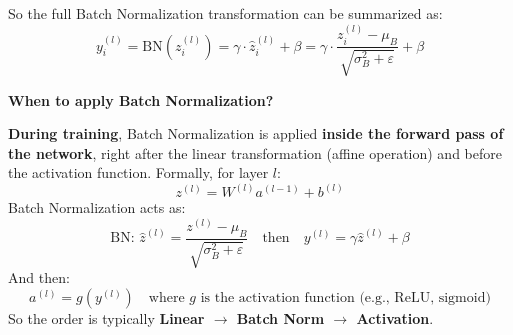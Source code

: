 \newpage

\noindent
So the full Batch Normalization transformation can be summarized as:
\begin{equation}
    y_i^{(l)} =
    \mathrm{BN}\left(z_i^{(l)}\right) =
    \gamma \cdot \hat{z}_i^{(l)} + \beta =
    \gamma \cdot \dfrac{z_i^{(l)} - \mu_B}{\sqrt{\sigma_B^2 + \varepsilon}} + \beta
\end{equation}

\highspace
\begin{flushleft}
    \textcolor{Green3}{ \textbf{When to apply Batch Normalization?}}
\end{flushleft}
\textbf{During training}, Batch Normalization is applied \textbf{inside the forward pass of the network}, right after the linear transformation (affine operation) and before the activation function. Formally, for layer $l$:
\begin{equation*}
    z^{(l)} = W^{(l)} a^{(l-1)} + b^{(l)}
\end{equation*}
Batch Normalization acts as:
\begin{equation*}
    \text{BN: } \hat{z}^{(l)} = \dfrac{z^{(l)} - \mu_B}{\sqrt{\sigma_B^2 + \varepsilon}} \quad \text{then} \quad y^{(l)} = \gamma \hat{z}^{(l)} + \beta
\end{equation*}
And then:
\begin{equation*}
    a^{(l)} = g\left(y^{(l)}\right) \quad \text{where } g \text{ is the activation function (e.g., ReLU, sigmoid)}
\end{equation*}
So the order is typically \textbf{Linear $\rightarrow$ Batch Norm $\rightarrow$ Activation}.

